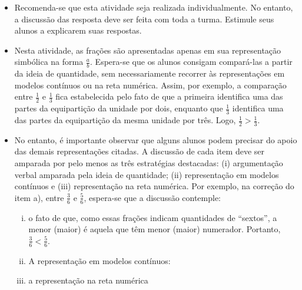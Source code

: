 \documentclass[oneside]{book}
\begin{document}
\begin{multicols}{2}
   \begin{itemize}
   \item   Recomenda-se que esta atividade seja realizada individualmente. No entanto, a discussão das resposta deve ser feita com toda a turma. Estimule seus alunos a explicarem suas respostas.
   \item Nesta atividade, as frações são apresentadas apenas em sua representação simbólica na forma $\frac{a}{b}$. Espera-se que os alunos consigam compará-las a partir da ideia de quantidade, sem necessariamente recorrer às representações em modelos contínuos ou na reta numérica. Assim, por exemplo, a comparação entre $\frac{1}{2}$ e $\frac{1}{3}$ fica estabelecida pelo fato de que a primeira identifica uma das partes da equipartição da unidade por dois, enquanto que $\frac{1}{3}$ identifica uma das partes da equipartição da mesma unidade por três. Logo, $\frac{1}{2} > \frac{1}{3}$. 
   \item No entanto, é importante observar que alguns alunos podem precisar do apoio das demais representações citadas. A discussão de cada item deve ser amparada por pelo menos as três estratégias destacadas: (i) argumentação verbal amparada pela ideia de quantidade; (ii) representação em modelos contínuos e (iii) representação na reta numérica. Por exemplo, na correção do item a), entre $\frac{3}{6}$ e $\frac{5}{6}$, espera-se que a discussão contemple:
   \begin{enumerate}[(i)]
    \item o fato de que, como essas frações indicam quantidades de ``sextos'', a menor (maior) é aquela que têm menor (maior) numerador. Portanto, $\frac{3}{6}< \frac{5}{6}$. 
    \item A representação em modelos contínuos: 
    \item a representação na reta numérica %
    \end{enumerate}
   

\end{itemize}
\end{multicols}
\end{document}
